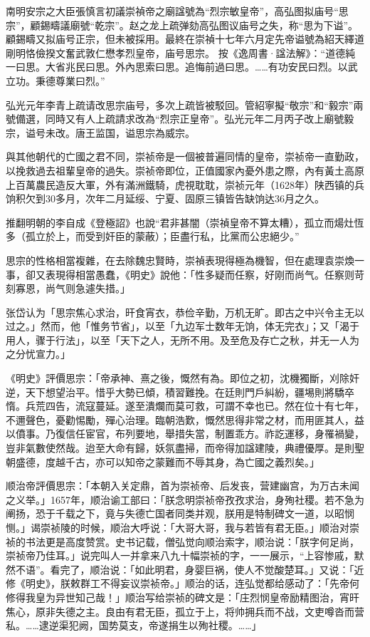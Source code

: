 南明安宗之大臣張慎言初議崇禎帝之廟諡號為“烈宗敏皇帝”，高弘图拟庙号“思宗”，顧錫疇議廟號“乾宗”。赵之龙上疏弹劾高弘图议庙号之失，称“思为下谥”。顧錫疇又拟庙号正宗，但未被採用。最終在崇禎十七年六月定先帝谥號為紹天繹道剛明恪儉揆文奮武敦仁懋孝烈皇帝，庙号思宗。 按《逸周書·諡法解》：“道德純一曰思。大省兆民曰思。外內思索曰思。追悔前過曰思。……有功安民曰烈。以武立功。秉德尊業曰烈。”

弘光元年李青上疏请改思宗庙号，多次上疏皆被駁回。管紹寧擬“敬宗”和“毅宗”兩號備選，同時又有人上疏請求改為“烈宗正皇帝”。弘光元年二月丙子改上廟號毅宗，谥号未改。唐王监国，谥思宗為威宗。

與其他朝代的亡國之君不同，崇祯帝是一個被普遍同情的皇帝，崇祯帝一直勤政，以挽救過去祖輩皇帝的過失。崇祯帝即位，正值國家內憂外患之際，內有黃土高原上百萬農民造反大軍，外有滿洲鐵騎，虎視耽耽，崇祯元年（1628年）陕西镇的兵饷积欠到30多月，次年二月延绥、宁夏、固原三镇皆告缺饷达36月之久。

推翻明朝的李自成《登極詔》也說“君非甚闇（崇禎皇帝不算太糟），孤立而煬灶恆多（孤立於上，而受到奸臣的蒙蔽）；臣盡行私，比黨而公忠絕少。”

思宗的性格相當複雜，在去除魏忠賢時，崇禎表現得極為機智，但在處理袁崇煥一事，卻又表現得相當愚蠢，《明史》說他：「性多疑而任察，好刚而尚气。任察则苛刻寡恩，尚气则急遽失措。」

张岱认为「思宗焦心求治，旰食宵衣，恭俭辛勤，万机无旷。即古之中兴令主无以过之。」然而，他「惟务节省」，以至「九边军士数年无饷，体无完衣」；又「渴于用人，骤于行法」，以至「天下之人，无所不用。及至危及存亡之秋，并无一人为之分忧宣力。」

《明史》評價思宗：「帝承神、熹之後，慨然有為。即位之初，沈機獨斷，刈除奸逆，天下想望治平。惜乎大勢已傾，積習難挽。在廷則門戶糾紛，疆埸則將驕卒惰。兵荒四告，流寇蔓延。遂至潰爛而莫可救，可謂不幸也已。然在位十有七年，不邇聲色，憂勸惕勵，殫心治理。臨朝浩歎，慨然思得非常之材，而用匪其人，益以僨事。乃復信任宦官，布列要地，舉措失當，制置乖方。祚訖運移，身罹禍變，豈非氣數使然哉。迨至大命有歸，妖氛盡掃，而帝得加諡建陵，典禮優厚。是則聖朝盛德，度越千古，亦可以知帝之蒙難而不辱其身，為亡國之義烈矣。」

顺治帝評價思宗：「本朝入关定鼎，首为崇祯帝、后发丧，营建幽宫，为万古未闻之义举。」1657年，顺治谕工部曰：「朕念明崇祯帝孜孜求治，身殉社稷。若不急为阐扬，恐于千载之下，竟与失德亡国者同类并观，朕用是特制碑文一道，以昭悯恻。」谒崇祯陵的时候，顺治大呼说：「大哥大哥，我与若皆有君无臣。」顺治对崇祯的书法更是高度赞赏。史书记载，僧弘觉向顺治索字，顺治说：「朕字何足尚，崇祯帝乃佳耳。」说完叫人一并拿来八九十幅崇祯的字，一一展示，“上容惨戚，默然不语”。看完了，顺治说：「如此明君，身婴巨祸，使人不觉酸楚耳。」又说：「近修《明史》，朕敕群工不得妄议崇祯帝。」顺治的话，连弘觉都给感动了：「先帝何修得我皇为异世知己哉！」顺治写给崇祯的碑文是：「庄烈悯皇帝励精图治，宵旰焦心，原非失德之主。良由有君无臣，孤立于上，将帅拥兵而不战，文吏噂沓而营私。……逮逆渠犯阙，国势莫支，帝遂捐生以殉社稷。……」

